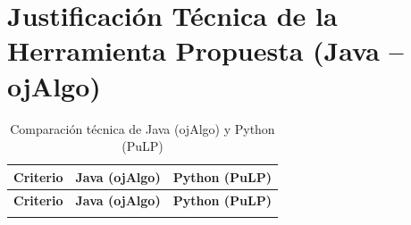 \documentclass[12pt,letterpaper]{article}
\begin{document}
\section{Justificación Técnica de la Herramienta Propuesta (Java -- ojAlgo)}

\small
\setlength{\LTpre}{0pt}
\setlength{\LTpost}{0pt}
\begin{longtable}{|>{\raggedright\arraybackslash}p{}|>{\raggedright\arraybackslash}p{}|>{\raggedright\arraybackslash}p{}|}
	\caption{Comparación técnica de Java (ojAlgo) y Python (PuLP)}\\
	\hline
	\textbf{Criterio} & \textbf{Java (ojAlgo)} & \textbf{Python (PuLP)} \\
	\hline
	\endfirsthead

	\hline
	\textbf{Criterio} & \textbf{Java (ojAlgo)} & \textbf{Python (PuLP)} \\
	\hline
	\endhead

	\hline
	\endfoot

	\hline
	\endlastfoot


\end{longtable}
\end{document}
